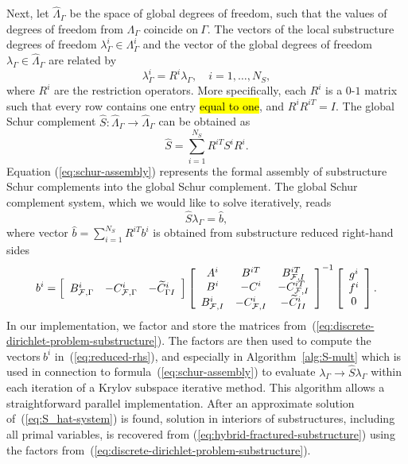 Next, let $\widehat{\Lambda}_{\Gamma}$ be the space of global degrees of
freedom, such that the values of degrees of freedom from $\Lambda_{\Gamma}$
coincide on$~\Gamma$. The vectors of the local substructure degrees of freedom
$\lambda_{\Gamma}^{i}\in\Lambda_{\Gamma}^{i}$ and the vector of the global
degrees of freedom $\lambda_{\Gamma}\in\widehat{\Lambda}_{\Gamma}$ are related
by
\begin{equation}
\lambda_{\Gamma}^{i}=R^{i}\lambda_{\Gamma},\quad i=1,\dots,N_{S},\label{eq:R}%
\end{equation}
where $R^{i}$ are the restriction operators. More specifically, each $R^{i}$ is a $0$-$1$
matrix such that every row contains one entry \hl{equal to one}, and $R^{i}R^{iT}=I$.
The global Schur complement $\widehat{S}:\widehat{\Lambda}_{\Gamma}%
\rightarrow\widehat{\Lambda}_{\Gamma}$ can be obtained as
\begin{equation}
\widehat{S}=\sum_{i=1}^{N_{S}}R^{iT}S^{i}R^{i}.\label{eq:schur-assembly}%
\end{equation}
Equation (\ref{eq:schur-assembly}) represents the formal assembly of
substructure Schur complements into the global Schur complement. The global
Schur complement system, which we would like to solve iteratively, reads
\begin{equation}
\widehat{S}\lambda_{\Gamma}=\widehat{b},\label{eq:S_hat-system}%
\end{equation}
where vector $\widehat{b}=\sum_{i=1}^{N_{S}}R^{iT}b^{i}$ is obtained from
substructure reduced right-hand sides
\begin{equation}
b^{i}=\left[
\begin{array}
[c]{ccc}%
B_{\mathcal{F},\Gamma}^{i} & -C_{\mathcal{F},\Gamma}^{i} & -\widetilde{C}%
_{{\Gamma}I}^{i}%
\end{array}
\right]  \left[
\begin{array}
[c]{ccc}%
A^{i} & B^{iT} & B_{\mathcal{F},I}^{iT}\\
B^{i} & -C^{i} & -C_{\mathcal{F},I}^{iT}\\
B_{\mathcal{F},I}^{i} & -C_{\mathcal{F},I}^{i} & -\widetilde{C}_{II}^{i}%
\end{array}
\right]  ^{-1}\left[
\begin{array}
[c]{c}%
g^{i}\\
f^{i}\\
0
\end{array}
\right]  .\label{eq:reduced-rhs}%
\end{equation}
In our implementation, we factor and store the matrices
from~(\ref{eq:discrete-dirichlet-problem-substructure}). The factors are then
used to compute the vectors$~b^{i}$ in~(\ref{eq:reduced-rhs}), and especially
in Algorithm~\ref{alg:S-mult} which is used in connection to formula~(\ref{eq:schur-assembly}) 
to evaluate $\lambda_{\Gamma}\rightarrow
\widehat{S}\lambda_{\Gamma}$ within each iteration of a Krylov subspace iterative
method. This algorithm allows a straightforward parallel implementation. After an approximate
solution of~(\ref{eq:S_hat-system}) is found, solution in interiors of
substructures, including all primal variables, is recovered
from (\ref{eq:hybrid-fractured-substructure})
using the factors
from~(\ref{eq:discrete-dirichlet-problem-substructure}).


